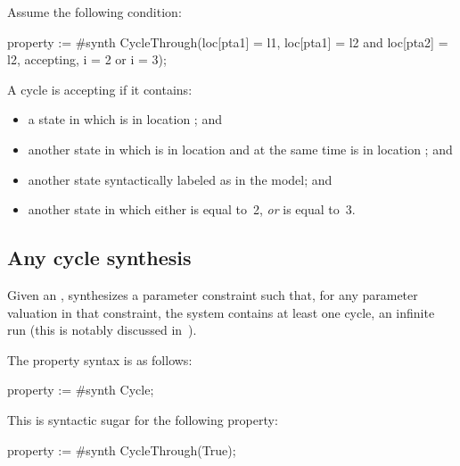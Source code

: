\begin{example}
	Assume the following condition:

\begin{IMITATORproperty}
property := #synth CycleThrough(loc[pta1] = l1, loc[pta1] = l2 and loc[pta2] = l2, accepting, i = 2 or i = 3);
\end{IMITATORproperty}

A cycle is accepting if it contains:
\begin{itemize}
	\item a state in which  is in location ; and
	\item another state in which  is in location  and at the same time  is in location ; and
	\item another state syntactically labeled as  in the model; and
	\item another state in which either  is equal to~2, \emph{or}  is equal to~3.
\end{itemize}


\end{example}


\subsection{Any cycle synthesis}\label{ss:loop}


Given an \NIPTA{}, \imitator{} synthesizes a parameter constraint such that, for any parameter valuation in that constraint, the system contains at least one cycle, \ie{} an infinite run (this is notably discussed in~\cite{ALime17}).

The property syntax is as follows:

\begin{IMITATORproperty}
property := #synth Cycle;
\end{IMITATORproperty}

This is syntactic sugar for the following property:

\begin{IMITATORproperty}
property := #synth CycleThrough(True);
\end{IMITATORproperty}

